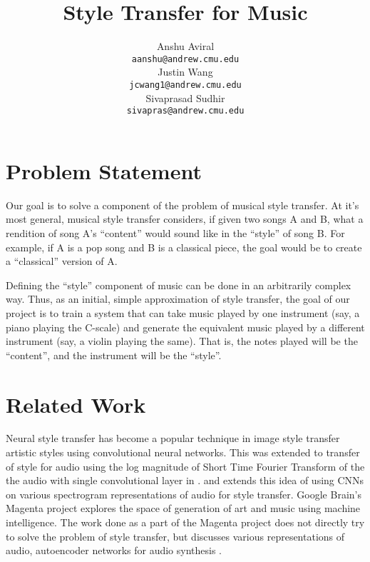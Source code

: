 \documentclass{article}
\title{Style Transfer for Music}
\author{
  Anshu Aviral\\
  \texttt{aanshu@andrew.cmu.edu} \\
  \And
  Justin Wang\\
  \texttt{jcwang1@andrew.cmu.edu} \\
  \And
  Sivaprasad Sudhir\\
  \texttt{sivapras@andrew.cmu.edu} 
}
\begin{document}

\maketitle
\section{Problem Statement}

Our goal is to solve a component of the problem of musical style transfer.  At it's most general, musical style transfer considers, if given two songs A and B, what a rendition of song A's ``content'' would sound like in the ``style'' of song B.  For example, if A is a pop song and B is a classical piece, the goal would be to create a ``classical'' version of A.

Defining the ``style'' component of music can be done in an arbitrarily complex way. Thus, as an initial, simple approximation of style transfer, the goal of our project is to train a system that can take music played by one instrument (say, a piano playing the C-scale) and generate the equivalent music played by a different instrument (say, a violin playing the same).  That is, the notes played will be the ``content'', and the instrument will be the ``style''.

\section{Related Work}
Neural style transfer\cite{gea15} has become a popular technique in image style transfer artistic styles using convolutional neural networks. This was extended to transfer of style for audio using the log magnitude of Short Time Fourier Transform of the the audio with single convolutional layer in \cite{ulyanov}. \cite{me17} and \cite{vs18} extends this idea of using CNNs on various spectrogram representations of audio for style transfer. Google Brain's Magenta project \cite{magenta} explores the space of generation of art and music using machine intelligence. The work done as a part of the Magenta project does not directly try to solve the problem of style transfer, but discusses various representations of audio, autoencoder networks for audio synthesis \cite{engel2017neural}. 
\end{document}
